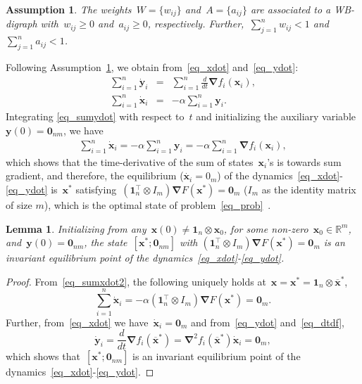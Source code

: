 \documentclass[letterpaper, 10pt, conference]{ieeeconf}
\newtheorem{lem}{Lemma}
\newtheorem{ass}{Assumption}
\def\mb{\mathbf}
\begin{document}
\begin{ass} \label{ass_Wg}
		The weights~${W=\{w_{ij}\}}$ and~${A=\{a_{ij}\}}$ are associated to a WB-digraph with~${w_{ij}\geq0}$ and~${a_{ij}\geq0}$, respectively. 
		Further,~$\sum_{j=1}^n w_{ij}<1$ and ~${\sum_{j=1}^n a_{ij}<1}$.
\end{ass}
Following Assumption~\ref{ass_Wg}, we obtain from~\eqref{eq_xdot} and~\eqref{eq_ydot}: 
\begin{eqnarray}
	\sum_{i=1}^n \dot{\mb{y}}_i 
	&=& \sum_{i=1}^n\frac{d}{d t} \boldsymbol{ \nabla} f_i(\mb{x}_i),  \label{eq_sumydot} \\ \label{eq_sumxdot} 
	\sum_{i=1}^n \dot{\mb{x}}_i 
	&=& -\alpha \sum_{i=1}^n\mb{y}_i.
\end{eqnarray}
Integrating \eqref{eq_sumydot} with respect to~$t$ and initializing the auxiliary variable~$\mb{y}(0)=\mb{0}_{nm}$, we have
\begin{eqnarray} \label{eq_sumxdot2}
	\sum_{i=1}^n \dot{\mb{x}}_i = -\alpha \sum_{i=1}^n\mb{y}_i = -\alpha \sum_{i=1}^n \boldsymbol{ \nabla} f_i(\mb{x}_i),
\end{eqnarray}
which shows that the time-derivative of the sum of states~$\mb{x}_i$'s is towards sum gradient, and therefore, the equilibrium ($\dot {\mathbf x_i}=0_m$) of the dynamics~\eqref{eq_xdot}-\eqref{eq_ydot} is~$\mb{x}^*$ satisfying~${(\mathbf 1_n^\top \otimes I_m) \boldsymbol{ \nabla} F(\mb{x}^*) = \mb{0}_m}$ ($I_m$ as the identity matrix of size $m$), which is the optimal state of  problem~\eqref{eq_prob}~\cite{gharesifard2013distributed}. 
\begin{lem} \label{lem_invariant}
	Initializing from any~$\mb{x}(0) \neq \mb{1}_n \otimes  {\mb{x}}_0$, for some non-zero~$\mathbf{x}_0\in\mathbb{R}^m$, and~$\mb{y}(0)=\mb{0}_{nm}$, the  state~$[\mb{x}^*;\mb{0}_{nm}]$ with $(\mathbf 1_n^\top \otimes I_m) \boldsymbol{ \nabla} F(\mb{x}^*) = \mb{0}_m$ is an invariant equilibrium point of the dynamics~\eqref{eq_xdot}-\eqref{eq_ydot}.
\end{lem}
\begin{proof}
	From~\eqref{eq_sumxdot2}, 
	the following uniquely holds at~${\mb{x}=\mb{x}^*=\mb{1}_n \otimes \overline{ \mb{x}}^*}$,
	\[\sum_{i=1}^n \dot{\mb{x}}_i = -\alpha (\mathbf 1_n^\top \otimes I_m) \boldsymbol{ \nabla} F(\mb{x}^*) =  \mb{0}_m.
	\]
	Further, from~\eqref{eq_xdot} we have~$\dot{\mb{x}}_i = \mb{0}_m$
	and from~\eqref{eq_ydot} and~\eqref{eq_dtdf},
	\[\dot{\mb{y}}_i = \frac{d}{d t} \boldsymbol{ \nabla} f_i(\overline{ \mb{x}}^*)=  \boldsymbol{ \nabla}^2 f_i(\overline{ \mb{x}}^*) \dot{\mb{x}}_i = \mb{0}_m,
	\] 
    which shows that~$[\mb{x}^*;\mb{0}_{nm}]$ is an invariant equilibrium point of the dynamics~\eqref{eq_xdot}-\eqref{eq_ydot}. 
\end{proof}
\end{document}
